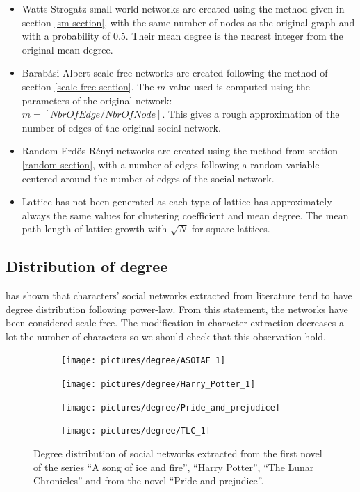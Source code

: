 \documentclass[a4paper, 12pt]{report}
\begin{document}
\begin{itemize}
\item Watts-Strogatz small-world networks are created using the method given in section \ref{sm-section}, with the same number of nodes as the original graph and with a probability of 0.5. Their mean degree is the nearest integer from the original mean degree.
\item Barabási-Albert scale-free networks are created following the method of section \ref{scale-free-section}. The $m$ value used is computed using the parameters of the original network:\\
$m = [NbrOfEdge / NbrOfNode]$. This gives a rough approximation of the number of edges of the original social network.
\item Random Erdös-Rényi networks are created using the method from section \ref{random-section}, with a number of edges following a random variable centered around the number of edges of the social network.
\item Lattice has not been generated as each type of lattice has approximately always the same values for clustering coefficient and mean degree. The mean path length of lattice growth with $\sqrt{N}$ for square lattices.
\end{itemize}

\subsection{Distribution of degree}
\cite{original} has shown that characters' social networks extracted from literature tend to have degree distribution following power-law. From this statement, the networks have been considered scale-free. The modification in character extraction decreases a lot the number of characters so we should check that this observation hold.\\

\begin{figure}
\begin{subfigure}{.49\textwidth}
\centering
\texttt{[image: pictures/degree/ASOIAF\_1]}
\end{subfigure}
\hfill
\begin{subfigure}{.49\textwidth}
\centering
\texttt{[image: pictures/degree/Harry\_Potter\_1]}
\end{subfigure}
\hfill
\begin{subfigure}{.49\textwidth}
\centering
\texttt{[image: pictures/degree/Pride\_and\_prejudice]}
\end{subfigure}
\begin{subfigure}{.49\textwidth}
\centering
\texttt{[image: pictures/degree/TLC\_1]}
\end{subfigure}
\caption{Degree distribution of social networks extracted from the first novel of the series ``A song of ice and fire'', ``Harry Potter'', ``The Lunar Chronicles'' and from the novel ``Pride and prejudice''.}
\label{distrib_degree_4_novels}
\end{figure}
\end{document}
